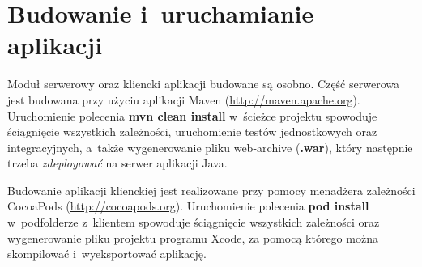 \documentclass[a4paper,12pt]{article}
\begin{document}
	\section*{Budowanie i~uruchamianie aplikacji}

	Moduł serwerowy oraz kliencki aplikacji budowane są osobno. Część serwerowa jest budowana przy użyciu aplikacji Maven (\url{http://maven.apache.org}). Uruchomienie polecenia \textbf{mvn clean install} w~ścieżce projektu spowoduje ściągnięcie wszystkich zależności, uruchomienie testów jednostkowych oraz integracyjnych, a~także wygenerowanie pliku web-archive (\textbf{.war}), który następnie trzeba \emph{zdeployować} na serwer aplikacji Java.

	Budowanie aplikacji klienckiej jest realizowane przy pomocy menadżera zależności CocoaPods (\url{http://cocoapods.org}). Uruchomienie polecenia \textbf{pod install} w~podfolderze z~klientem spowoduje ściągnięcie wszystkich zależności oraz wygenerowanie pliku projektu programu Xcode, za pomocą którego można skompilować i~wyeksportować aplikację.
\end{document}
